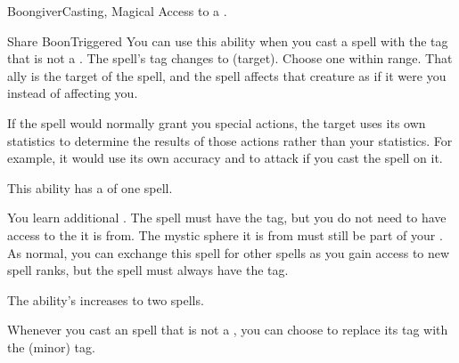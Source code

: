  \begin{magicalfeat}{Boongiver}{Casting, Magical}
    \featpre Access to a .

    \begin{magicaltriggeredability}{Share Boon}{Triggered}
      \rankline
      You can use this ability when you cast a spell with the  tag that is not a .
      The spell's  tag changes to  (target).
      Choose one  within \rngmed range.
      That ally is the target of the spell, and the spell affects that creature as if it were you instead of affecting you.

      If the spell would normally grant you special actions, the target uses its own statistics to determine the results of those actions rather than your statistics.
      For example, it would use its own accuracy and  to attack if you cast the  spell on it.

      This ability has a  of one spell.
    \end{magicaltriggeredability}

     You learn additional .
    The spell must have the  tag, but you do not need to have access to the  it is from.
    The mystic sphere it is from must still be part of your .
    As normal, you can exchange this spell for other spells as you gain access to new spell ranks, but the spell must always have the  tag.

     The ability's  increases to two spells.

     Whenever you cast an  spell that is not a , you can choose to replace its  tag with the  (minor) tag.
  \end{magicalfeat}

